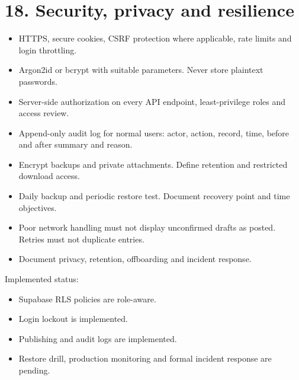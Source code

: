 \documentclass[11pt]{article}
\begin{document}
\section{18. Security, privacy and resilience}
\begin{itemize}[leftmargin=*,itemsep=2pt,topsep=2pt]
\item HTTPS, secure cookies, CSRF protection where applicable, rate limits and login throttling.
\item Argon2id or bcrypt with suitable parameters. Never store plaintext passwords.
\item Server-side authorization on every API endpoint, least-privilege roles and access review.
\item Append-only audit log for normal users: actor, action, record, time, before and after summary and reason.
\item Encrypt backups and private attachments. Define retention and restricted download access.
\item Daily backup and periodic restore test. Document recovery point and time objectives.
\item Poor network handling must not display unconfirmed drafts as posted. Retries must not duplicate entries.
\item Document privacy, retention, offboarding and incident response.
\end{itemize}
Implemented status:
\begin{itemize}[leftmargin=*,itemsep=2pt,topsep=2pt]
\item Supabase RLS policies are role-aware.
\item Login lockout is implemented.
\item Publishing and audit logs are implemented.
\item Restore drill, production monitoring and formal incident response are pending.
\end{itemize}
\clearpage
\end{document}
